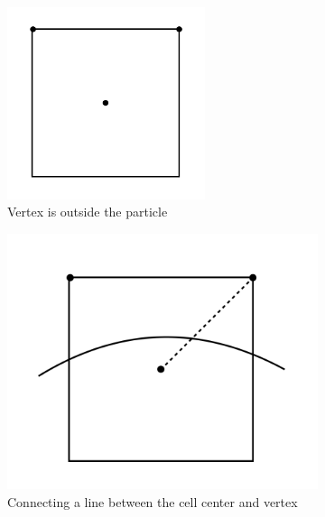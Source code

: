 \begin{figure}[!ht]
    \centering
    \begin{subfigure}[b]{0.47\textwidth}
    \centering
        \includegraphics[width=5.8cm]{Images/chap3/1.png}
        \caption{Vertex is outside the particle}
    \end{subfigure}
    \hfill
    \begin{subfigure}[b]{0.47\textwidth}
        \includegraphics[width=\textwidth]{Images/chap3/2.png}
        \caption{Connecting a line between the cell center and vertex}
    \end{subfigure}
    \begin{subfigure}[b]{0.47\textwidth}

\end{subfigure}
\end{figure}
